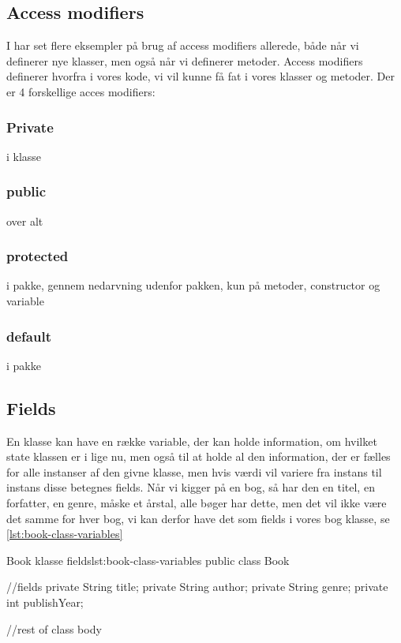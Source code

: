 \subsection{Access modifiers}

I har set flere eksempler på brug af access modifiers allerede, både når vi definerer nye klasser, men også når vi definerer metoder. Access modifiers definerer hvorfra i vores kode, vi vil kunne få fat i vores klasser og metoder. Der er 4 forskellige acces modifiers:

\subsubsection{Private}

i klasse

\subsubsection{public} 

over alt

\subsubsection{protected} 

i pakke, gennem nedarvning udenfor pakken, kun på metoder, constructor og variable

\subsubsection{default} 

i pakke

\subsection{Fields}
En klasse kan have en række variable, der kan holde information, om hvilket state klassen er i lige nu, men også til at holde al den information, der er fælles for alle instanser af den givne klasse, men hvis værdi vil variere fra instans til instans disse betegnes fields. Når vi kigger på en bog, så har den en titel, en forfatter, en genre, måske et årstal, alle bøger har dette, men det vil ikke være det samme for hver bog, vi kan derfor have det som fields i vores bog klasse, se \autoref{lst:book-class-variables}

\begin{JavaCode}{Book klasse fields}{lst:book-class-variables}
	public class Book {
		//fields
		private String title;
		private String author;
		private String genre;
		private int publishYear;
		
		//rest of class body
	}
\end{JavaCode}

